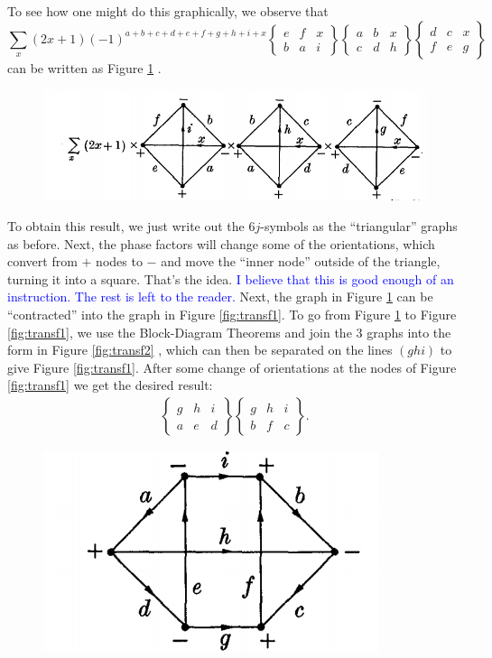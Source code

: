 \documentclass[11pt]{article}
\newcommand{\Gj}[6]{ \begin{Bmatrix}
		#1 & #2 & #3 \\
		#4 & #5 & #6 
\end{Bmatrix}}
\begin{document}
\begin{appendices}
To see how one might do this graphically, we observe that 
\begin{equation*}
\sum_{x}(2x+1)(-1)^{a+b+c+d+e+f+g+h+i+x}
\Gj{e}{f}{x}{b}{a}{i} 
\Gj{a}{b}{x}{c}{d}{h} 
\Gj{d}{c}{x}{f}{e}{g} 
\end{equation*}
can be written as Figure \ref{fig:transf} \cite{angular_momentum}.
\begin{figure}[!htb]
	\centering
	\includegraphics[scale=0.7]{transformation_1}
	\caption{}
	\label{fig:transf}
\end{figure}
To obtain this result, we just write out the $6j$-symbols as the ``triangular'' graphs as before. Next, the phase factors will change some of the orientations, which convert from $+$ nodes to $-$ and move the ``inner node'' outside of the triangle, turning it into a square. That's the idea. \textcolor{blue}{I believe that this is good enough of an instruction. The rest is left to the reader.} Next, the graph in Figure \ref{fig:transf} \cite{angular_momentum} can be ``contracted'' into the graph in Figure \ref{fig:transf1}. To go from Figure \ref{fig:transf} to Figure \ref{fig:transf1}, we use the Block-Diagram Theorems and join the 3 graphs into the form in Figure \ref{fig:transf2} \cite{angular_momentum}, which can then be separated on the lines $(ghi)$ to give Figure \ref{fig:transf1}. After some change of orientations at the nodes of Figure \ref{fig:transf1} we get the desired result: 
\begin{align*}
\Gj{g}{h}{i}{a}{e}{d} 
\Gj{g}{h}{i}{b}{f}{c}.
\end{align*}
\begin{figure}[!htb]
	\centering
	\includegraphics[scale=0.7]{transformation_3}

\end{figure}
\end{appendices}
\end{document}
